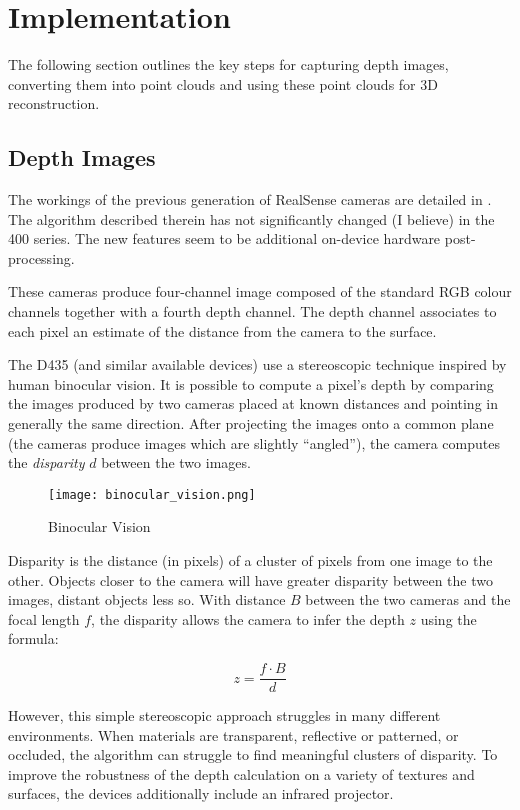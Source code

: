 \section{Implementation}

The following section outlines the key steps for capturing
depth images, converting them into point clouds and using these point clouds
for 3D reconstruction.

\subsection{Depth Images}
 The workings of the previous generation of RealSense cameras are detailed in \cite{keselman2017intel}.
The algorithm described therein has not significantly changed (I believe) in the 400 series.
The new features seem to be additional on-device hardware post-processing.

These cameras produce four-channel image composed of the standard RGB colour channels together with a fourth depth channel. The depth channel associates to each pixel an estimate of the distance from the camera to the surface.

The D435 (and similar available devices) use a stereoscopic technique inspired by human
binocular vision.
It is possible to compute a pixel's depth by comparing the images produced by two cameras placed at known distances and pointing in generally the same direction. After projecting the images onto a common plane (the cameras produce images which are slightly ``angled''), the camera computes the \textit{disparity}
 $d$ between the two images.

\begin{figure}[h]
 \centering
 \texttt{[image: binocular\_vision.png]}
 \caption{Binocular Vision}
 \end{figure}

Disparity is the distance (in pixels) of a cluster of pixels from one image to the other.
Objects closer to the camera will have greater disparity between the two images, distant
objects less so.
With distance $B$ between the two cameras and the focal length $f$, the disparity allows the camera
to infer the depth $z$ using the formula:

\[ z = \frac{f \cdot B}{d} \]

However, this simple stereoscopic approach struggles in many different
environments. When materials are transparent, reflective or patterned, or occluded,
the algorithm can struggle to find meaningful clusters of disparity.
To improve the robustness of the depth calculation on a variety
of textures and surfaces, the devices additionally include an infrared projector.

